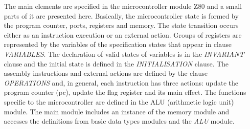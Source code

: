 \documentclass[a4paper]{llncs}
\begin{document}
The main elements are specified in the microcontroller
module Z80 and a small parts of it are presented here.  Basically, the
microcontroller state is formed by the program counter, ports,
registers and memory. The state transition occurs either as an instruction
execution or an external action. Groups of registers are represented
by the variables of the specification states that appear in clause
\textit{VARIABLES}. The declaration of valid states of variables is in
the \textit{INVARIANT} clause and the initial state is defined in the
\textit{INITIALISATION} clause. The assembly instructions and external actions are defined
by the clause \textit{OPERATIONS} and, in general, each instruction
has three actions: update the program counter (pc), update the flag
register and its main effect.
The functions specific to the microcontroller are defined in the ALU
(arithmetic logic unit) module. The main module includes an instance of
the memory module and accesses the definitions from basic data types
modules and the \textit{ALU} module.
%
%	
%	  
%
\end{document}
